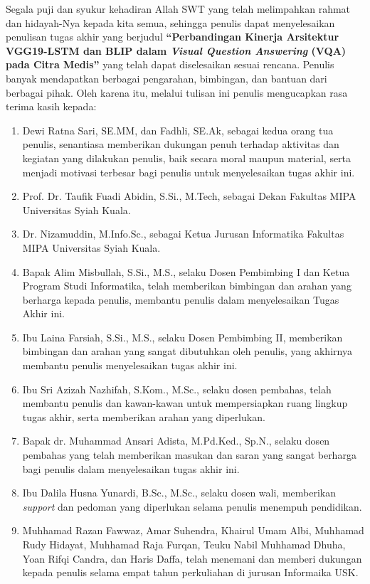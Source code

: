 \preface %

Segala puji dan syukur kehadiran Allah SWT yang telah melimpahkan rahmat dan hidayah-Nya kepada kita semua, sehingga penulis dapat menyelesaikan penulisan tugas akhir yang berjudul \textbf{“Perbandingan Kinerja Arsitektur VGG19-LSTM dan BLIP dalam \textit{Visual Question Answering} (VQA) pada Citra Medis”} yang telah dapat diselesaikan sesuai rencana. Penulis banyak mendapatkan berbagai pengarahan, bimbingan, dan bantuan dari berbagai pihak. Oleh karena itu, melalui tulisan ini penulis mengucapkan rasa terima kasih kepada:

\begin{enumerate}
	\item Dewi Ratna Sari, SE.MM, dan Fadhli, SE.Ak, sebagai kedua orang tua penulis, senantiasa memberikan dukungan penuh terhadap aktivitas dan kegiatan yang dilakukan penulis, baik secara moral maupun material, serta menjadi motivasi terbesar bagi penulis untuk menyelesaikan tugas akhir ini.
    \item Prof. Dr. Taufik Fuadi Abidin, S.Si., M.Tech, sebagai Dekan Fakultas MIPA Universitas Syiah Kuala.
    \item Dr. Nizamuddin, M.Info.Sc., sebagai Ketua Jurusan Informatika Fakultas MIPA Universitas Syiah Kuala.
    \item Bapak Alim Misbullah, S.Si., M.S., selaku Dosen Pembimbing I dan Ketua Program Studi Informatika, telah memberikan bimbingan dan arahan yang berharga kepada penulis, membantu penulis dalam menyelesaikan Tugas Akhir ini.
    \item Ibu Laina Farsiah, S.Si., M.S., selaku Dosen Pembimbing II, memberikan bimbingan dan arahan yang sangat dibutuhkan oleh penulis, yang akhirnya membantu penulis menyelesaikan tugas akhir ini.
    \item Ibu Sri Azizah Nazhifah, S.Kom., M.Sc., selaku dosen pembahas, telah membantu penulis dan kawan-kawan untuk mempersiapkan ruang lingkup tugas akhir, serta memberikan arahan yang diperlukan.
    \item Bapak dr. Muhammad Ansari Adista, M.Pd.Ked., Sp.N., selaku dosen pembahas yang telah memberikan masukan dan saran yang sangat berharga bagi penulis dalam menyelesaikan tugas akhir ini.
    \item Ibu Dalila Husna Yunardi, B.Sc., M.Sc., selaku dosen wali, memberikan \textit{support} dan pedoman yang diperlukan selama penulis menempuh pendidikan.
    \item Muhhamad Razan Fawwaz, Amar Suhendra, Khairul Umam Albi, Muhhamad Rudy Hidayat, Muhhamad Raja Furqan, Teuku Nabil Muhhamad Dhuha, Yoan Rifqi Candra, dan Haris Daffa, telah menemani dan memberi dukungan kepada penulis selama empat tahun perkuliahan di jurusan Informaika USK.

\end{enumerate}
